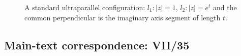 \begin{solution}
\begin{figure}[htbp]
		\caption{A standard ultraparallel configuration: $l_1:|z|=1$, $l_2:|z|=e^t$ and the common perpendicular is the imaginary axis segment of length $t$.}
	\end{figure}
	
	


\end{solution}

\subsection*{Main-text correspondence: VII/35}

